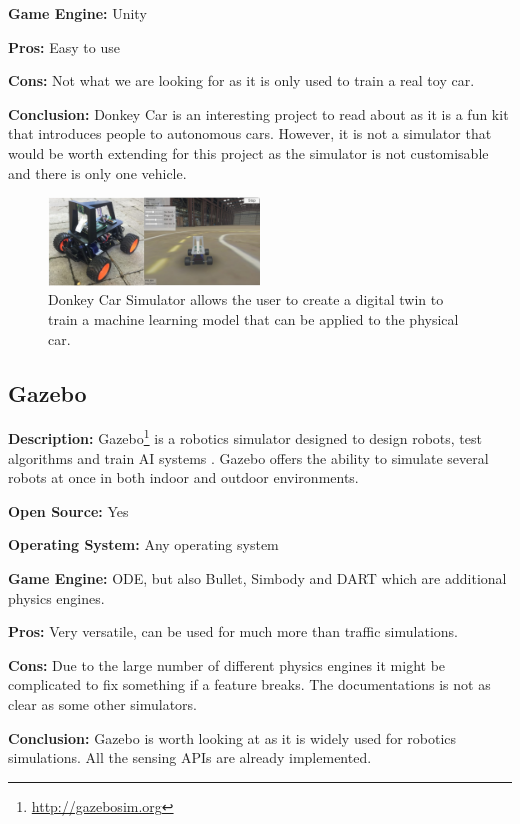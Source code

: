 \textbf{Game Engine:} Unity

\textbf{Pros:} Easy to use

\textbf{Cons:} Not what we are looking for as it is only used to train a real toy car.

\textbf{Conclusion:} Donkey Car is an interesting project to read about as it is a fun kit that introduces people to autonomous cars. However, it is not a simulator that would be worth extending for this project as the simulator is not customisable and there is only one vehicle. 


\begin{figure}[H]
    \centering
    \includegraphics[width=0.5\textwidth]{03_Background/Appendix/Simulators/DonkeySim.jpg}
    \caption[Donkey Car Simulator]{Donkey Car Simulator allows the user to create a digital twin to train a machine learning model that can be applied to the physical car.}
\end{figure}

\subsection{Gazebo}\label{gazebo}
\textbf{Description:} Gazebo\footnote{\url{http://gazebosim.org}} is a robotics simulator designed to design robots, test algorithms and train AI systems \cite{Gazebo_Website}. Gazebo offers the ability to simulate several robots at once in both indoor and outdoor environments.

\textbf{Open Source:} Yes

\textbf{Operating System:} Any operating system

\textbf{Game Engine:} ODE, but also Bullet, Simbody and DART which are additional physics engines. 

\textbf{Pros:} Very versatile, can be used for much more than traffic simulations. 

\textbf{Cons:} Due to the large number of different physics engines it might be complicated to fix something if a feature breaks. The documentations is not as clear as some other simulators. 

\textbf{Conclusion:} Gazebo is worth looking at as it is widely used for robotics simulations. All the sensing APIs are already implemented.


